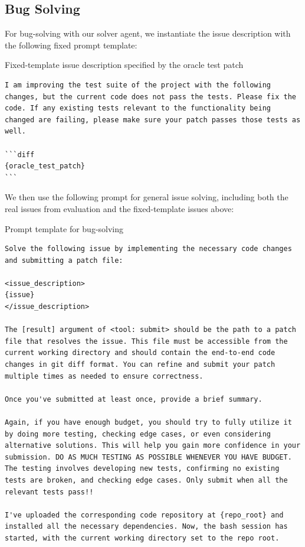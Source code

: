 \subsection{Bug Solving}
\label{sec:apd:prompt_bug_solving}

For bug-solving with our solver agent, we instantiate the issue description with the following fixed prompt template:

\begin{promptbox}{Fixed-template issue description specified by the oracle test patch}
    \begin{Verbatim}[breaklines=true]
I am improving the test suite of the project with the following changes, but the current code does not pass the tests. Please fix the code. If any existing tests relevant to the functionality being changed are failing, please make sure your patch passes those tests as well.

```diff
{oracle_test_patch}
```
\end{Verbatim}
\end{promptbox}

We then use the following prompt for general issue solving, including both the real issues from evaluation and the fixed-template issues above:

\begin{promptbox}{Prompt template for bug-solving}
\begin{Verbatim}[breaklines=true]
Solve the following issue by implementing the necessary code changes and submitting a patch file:

<issue_description>
{issue}
</issue_description>

The [result] argument of <tool: submit> should be the path to a patch file that resolves the issue. This file must be accessible from the current working directory and should contain the end-to-end code changes in git diff format. You can refine and submit your patch multiple times as needed to ensure correctness.

Once you've submitted at least once, provide a brief summary.

Again, if you have enough budget, you should try to fully utilize it by doing more testing, checking edge cases, or even considering alternative solutions. This will help you gain more confidence in your submission. DO AS MUCH TESTING AS POSSIBLE WHENEVER YOU HAVE BUDGET. The testing involves developing new tests, confirming no existing tests are broken, and checking edge cases. Only submit when all the relevant tests pass!!

I've uploaded the corresponding code repository at {repo_root} and installed all the necessary dependencies. Now, the bash session has started, with the current working directory set to the repo root.
\end{Verbatim}
\end{promptbox}



